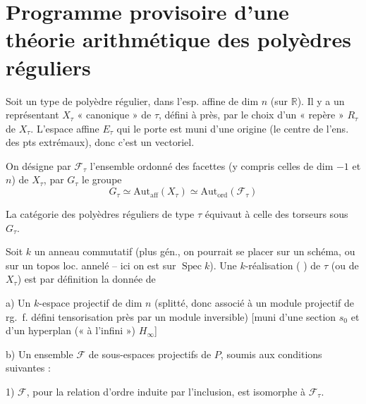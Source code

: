 \documentclass[11pt,a4paper]{article}
\begin{document}
\section{Programme provisoire d'une théorie arithmétique des polyèdres réguliers}


Soit un type \add{$\tau$} de polyèdre régulier, dans l'esp. affine de dim $n$
(sur $\mathbb{R}$). Il y a un représentant $X_\tau$ « canonique » de $\tau$,
défini à  près, par le choix d'un « repère » $R_\tau$ de
$X_\tau$. L'espace affine $E_\tau$ qui le porte est muni d'une origine (le
 centre  de l'ens. des pts
extrémaux), donc c'est un vectoriel.

On désigne par $\mathcal{F}_\tau$ l'ensemble ordonné des facettes (y compris
celles de dim $-1$ et $n$) de $X_\tau$, par $G_\tau$ le groupe
\[
  G_\tau \simeq \mathrm{Aut}_{\mathrm{aff}}(X_\tau) \simeq \mathrm{Aut}_{\mathrm{ord}}(\mathcal{F}_\tau)
\]

La catégorie des polyèdres réguliers de type $\tau$ équivaut à celle des
torseurs sous $G_\tau$.

Soit $k$ un anneau commutatif (plus gén., on pourrait se placer sur un schéma,
ou sur un topos loc. annelé -- ici on est sur $\operatorname{Spec} k$).
Une $k$-réalisation (
) de  $\tau$ (ou de $X_\tau$)
est par définition la donnée de

a) Un $k$-espace projectif  de dim $n$ (splitté, donc associé à un
module projectif de rg.~f. défini \ill{} tensorisation près par un
\struck{\ill{}} module inversible) [muni d'une section $s_0$ et d'un hyperplan
(« à l'infini ») $H_\infty$]

b) Un ensemble $\mathcal{F}$ de sous-espaces projectifs  de $P$,
 soumis aux conditions suivantes :

1) $\mathcal{F}$, pour la relation d'ordre induite par l'inclusion, est
isomorphe à $\mathcal{F}_\tau$.
\end{document}
